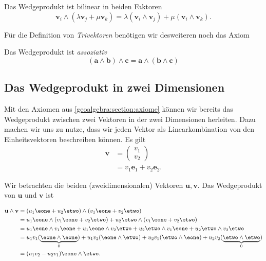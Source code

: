 \begin{axiom}
  Das Wedgeprodukt ist bilinear in beiden Faktoren
  \begin{equation}
  \mathbf{v}_i \wedge (\lambda \mathbf{v}_j + \mu \mathbf{v}_k) 
  = \lambda (\mathbf{v}_i \wedge \mathbf{v}_j) + \mu (\mathbf{v}_i \wedge \mathbf{v}_k).
    \label{geoalgebra:eq:bilinear}
  \end{equation}
\end{axiom}

Für die Definition von \emph{Trivektoren} benötigen wir desweiteren noch das Axiom
\begin{axiom}
  Das Wedgeprodukt ist \em{assoziativ}
  \begin{equation*}
    (\mathbf{a} \wedge \mathbf{b}) \wedge \mathbf{c} = \mathbf{a} \wedge (\mathbf{b} \wedge \mathbf{c})
  \end{equation*}
\end{axiom}

\subsection{Das Wedgeprodukt in zwei Dimensionen}

Mit den Axiomen aus \autoref{geoalgebra:section:axiome} können wir bereits das Wedgeprodukt zwischen zwei
Vektoren in der zwei Dimensionen herleiten.
Dazu machen wir uns zu nutze, dass wir jeden Vektor als
Linearkombination von den Einheitsvektoren beschreiben können.
Es gilt
\begin{align}
  \mathbf{v} &= \begin{pmatrix} v_1 \\ v_2 \end{pmatrix} \\
    &= v_1 \mathbf{e}_1 + v_2 \mathbf{e}_2.
\end{align}

\begin{definition}
  Wir betrachten die beiden (zweidimensionalen) Vektoren $\mathbf{u},
  \mathbf{v}$.
  Das Wedgeprodukt von $\mathbf{u}$ und $\mathbf{v}$ ist

  \begin{equation}
    \begin{aligned}
    \mathbf{u} \wedge \mathbf{v} &= (u_1 \eone + u_2 \etwo) \wedge
    (v_1 \eone + v_2 \etwo) \\
    &= u_1 \eone \wedge (v_1 \eone + v_2 \etwo) + u_2 \etwo \wedge (v_1 \eone + v_2 \etwo) \\
    &= u_1 \eone \wedge v_1 \eone + u_1 \eone \wedge v_2 \etwo + u_2 \etwo \wedge v_1 \eone + u_2 \etwo \wedge v_2 \etwo \\
    &= u_1 v_1 (\underbrace{\eone \wedge \eone}_{0}) + u_1 v_2 (\eone \wedge \etwo) + u_2 v_1 (\etwo \wedge \eone) + u_2 v_2 (\underbrace{\etwo \wedge \etwo}_{0}) \\
    &= (u_1 v_2 - u_2 v_1) \eone \wedge \etwo.
    \end{aligned}
    \label{geoalgebra:eq:2d-wedgeproduct}
  \end{equation}
\end{definition}

